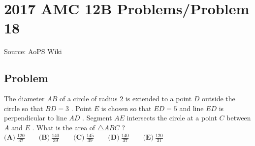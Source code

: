 \documentclass[12pt]{article}
\begin{document}
\section*{{2017 AMC 12B Problems/Problem 18}}
Source: AoPS Wiki

\subsection*{Problem}
The diameter $AB$ of a circle of radius $2$ is extended to a point $D$ outside the circle so that $BD=3$ . Point $E$ is chosen so that $ED=5$ and line $ED$ is perpendicular to line $AD$ . Segment $AE$ intersects the circle at a point $C$ between $A$ and $E$ . What is the area of $\triangle ABC$ ? $\textbf{(A)}\ \frac{120}{37}\qquad\textbf{(B)}\ \frac{140}{39}\qquad\textbf{(C)}\ \frac{145}{39}\qquad\textbf{(D)}\ \frac{140}{37}\qquad\textbf{(E)}\ \frac{120}{31}$
\end{document}

